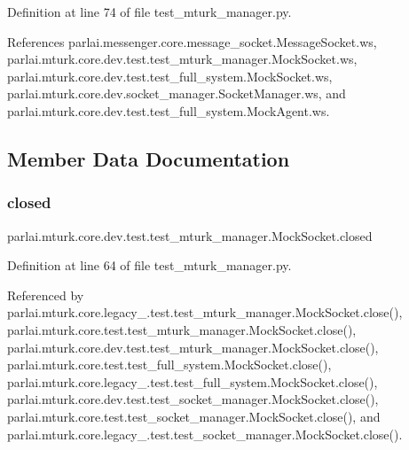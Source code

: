 Definition at line 74 of file test\+\_\+mturk\+\_\+manager.\+py.



References parlai.\+messenger.\+core.\+message\+\_\+socket.\+Message\+Socket.\+ws, parlai.\+mturk.\+core.\+dev.\+test.\+test\+\_\+mturk\+\_\+manager.\+Mock\+Socket.\+ws, parlai.\+mturk.\+core.\+dev.\+test.\+test\+\_\+full\+\_\+system.\+Mock\+Socket.\+ws, parlai.\+mturk.\+core.\+dev.\+socket\+\_\+manager.\+Socket\+Manager.\+ws, and parlai.\+mturk.\+core.\+dev.\+test.\+test\+\_\+full\+\_\+system.\+Mock\+Agent.\+ws.



\subsection{Member Data Documentation}
\mbox{\label{classparlai_1_1mturk_1_1core_1_1dev_1_1test_1_1test__mturk__manager_1_1MockSocket_a78e99069984ec0340a693cf84b17350a}} 
\subsubsection{\texorpdfstring{closed}{closed}}
{\footnotesize\ttfamily parlai.\+mturk.\+core.\+dev.\+test.\+test\+\_\+mturk\+\_\+manager.\+Mock\+Socket.\+closed}



Definition at line 64 of file test\+\_\+mturk\+\_\+manager.\+py.



Referenced by parlai.\+mturk.\+core.\+legacy\+\_.\+test.\+test\+\_\+mturk\+\_\+manager.\+Mock\+Socket.\+close(), parlai.\+mturk.\+core.\+test.\+test\+\_\+mturk\+\_\+manager.\+Mock\+Socket.\+close(), parlai.\+mturk.\+core.\+dev.\+test.\+test\+\_\+mturk\+\_\+manager.\+Mock\+Socket.\+close(), parlai.\+mturk.\+core.\+test.\+test\+\_\+full\+\_\+system.\+Mock\+Socket.\+close(), parlai.\+mturk.\+core.\+legacy\+\_.\+test.\+test\+\_\+full\+\_\+system.\+Mock\+Socket.\+close(), parlai.\+mturk.\+core.\+dev.\+test.\+test\+\_\+socket\+\_\+manager.\+Mock\+Socket.\+close(), parlai.\+mturk.\+core.\+test.\+test\+\_\+socket\+\_\+manager.\+Mock\+Socket.\+close(), and parlai.\+mturk.\+core.\+legacy\+\_.\+test.\+test\+\_\+socket\+\_\+manager.\+Mock\+Socket.\+close().

